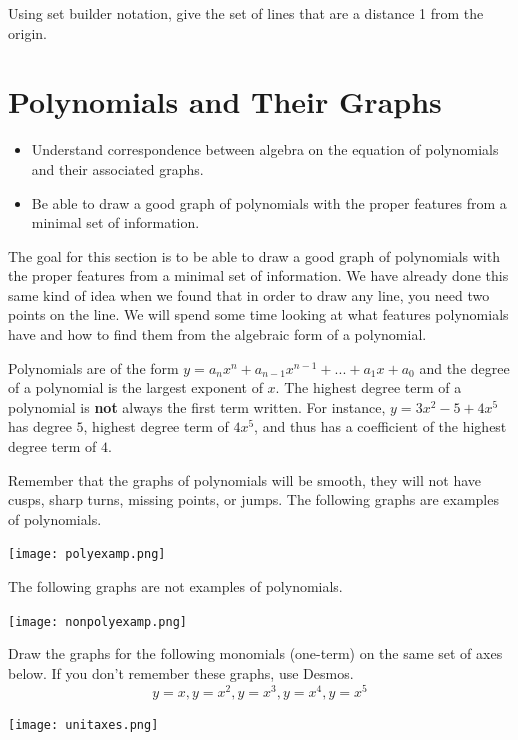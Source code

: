 \bq Using set builder notation, give the set of lines that are a distance 1 from the origin.
\eq

\section{Polynomials and Their Graphs}
\begin{itemize}
  \item Understand correspondence between algebra on the equation of polynomials and their associated graphs.
  \item Be able to draw a good graph of polynomials with the proper features from a minimal set of information.
\end{itemize}
The goal for this section is to be able to draw a good graph of polynomials with the proper features from a minimal set of information. We have already done this same kind of idea when we found that in order to draw any line, you need two points on the line.
We will spend some time looking at what features polynomials have and how to find them from the algebraic form of a polynomial.

Polynomials are of the form $y=a_n x^n+a_{n-1} x^{n-1}+ ...+a_1 x+a_0$ and the degree of a polynomial is the largest exponent of $x$. The highest degree term of a polynomial is \textbf{not} always the first term written. For instance, $y=3x^2-5+4x^5$ has degree $5$, highest degree term of $4x^5$, and thus has a coefficient of the highest degree term of $4$.

Remember that the graphs of polynomials will be smooth, they will not have cusps, sharp turns, missing points, or jumps. The following graphs are examples of polynomials.

\begin{center} \texttt{[image: polyexamp.png]} \end{center}

The following graphs are not examples of polynomials.

\begin{center} \texttt{[image: nonpolyexamp.png]} \end{center}


\bq Draw the graphs for the following monomials (one-term) on the same set of axes below. If you don't remember these graphs, use Desmos.
$$ y=x, y=x^2, y=x^3, y=x^4, y=x^5$$

\begin{center} \texttt{[image: unitaxes.png]} \end{center}

